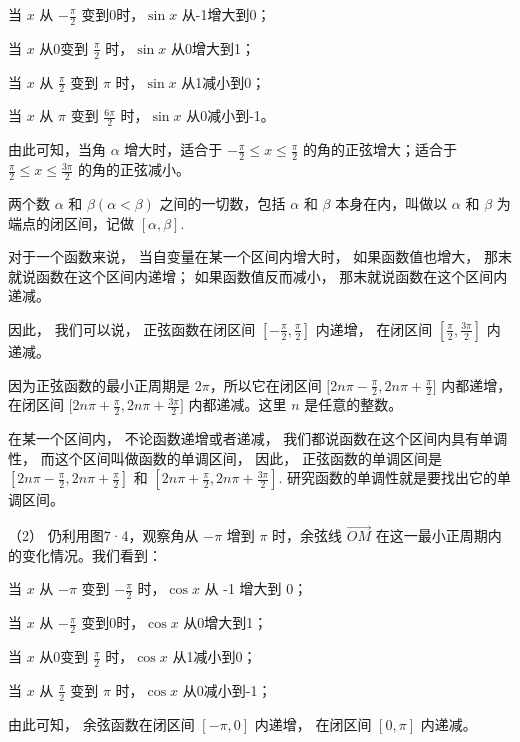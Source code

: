 当 \(x\) 从 \(-\frac{\pi}{2}\) 变到0时，\(\sin x\) 从-1增大到0；

当 \(x\) 从0变到 \(\frac{\pi}{2}\) 时，\(\sin x\) 从0增大到1；

当 \(x\) 从 \(\frac{\pi}{2}\) 变到 \(\pi\) 时，\(\sin x\) 从1减小到0；

当 \(x\) 从 \(\pi\) 变到 \(\frac{6\pi}{2}\) 时，\(\sin x\) 从0减小到-1。

由此可知，当角 \(\alpha\) 增大时，适合于
\(-\frac{\pi}{2} \leqslant x \leqslant \frac{\pi}{2}\)
的角的正弦增大；适合于
\(\frac{\pi}{2} \leqslant x \leqslant \frac{3\pi}{2}\) 的角的正弦减小。

两个数 \(\alpha\) 和 \(\beta (\alpha < \beta)\) 之间的一切数，包括
\(\alpha\) 和 \(\beta\) 本身在内，叫做以 \(\alpha\) 和 \(\beta\)
为端点的闭区间，记做 \([\alpha, \beta]\).

对于一个函数来说， 当自变量在某一个区间内增大时， 如果函数值也增大，
那末就说函数在这个区间内递增； 如果函数值反而减小，
那末就说函数在这个区间内递减。

因此， 我们可以说， 正弦函数在闭区间
\(\left[-\frac{\pi}{2}, \frac{\pi}{2}\right]\) 内递增， 在闭区间
\(\left[\frac{\pi}{2}, \frac{3\pi}{2}\right]\) 内递减。

因为正弦函数的最小正周期是 \(2\pi\)，所以它在闭区间
\(\bigl[2n\pi - \frac{\pi}{2}, 2n\pi + \frac{\pi}{2}\bigr]\)
内都递增，在闭区间
\(\bigl[2n\pi + \frac{\pi}{2}, 2n\pi + \frac{3\pi}{2}\bigr]\)
内都递减。这里 \(n\) 是任意的整数。

在某一个区间内， 不论函数递增或者递减，
我们都说函数在这个区间内具有单调性， 而这个区间叫做函数的单调区间，
因此， 正弦函数的单调区间是
\(\left[2n\pi - \frac{\pi}{2}, 2n\pi + \frac{\pi}{2}\right]\) 和
\(\left[2n\pi +\frac{\pi}{2},2n\pi +\frac{3\pi}{2}\right].\)
研究函数的单调性就是要找出它的单调区间。

（2） 仍利用图7·4，观察角从 \(-\pi\) 增到 \(\pi\) 时，余弦线
\(\overrightarrow{OM}\) 在这一最小正周期内的变化情况。我们看到：

当 \(x\) 从 \(-\pi\) 变到 \(-\frac{\pi}{2}\) 时，\(\cos x\) 从 -1 增大到
0；

当 \(x\) 从 \(-\frac{\pi}{2}\) 变到0时，\(\cos x\) 从0增大到1；

当 \(x\) 从0变到 \(\frac{\pi}{2}\) 时，\(\cos x\) 从1减小到0；

当 \(x\) 从 \(\frac{\pi}{2}\) 变到 \(\pi\) 时，\(\cos x\) 从0减小到-1；

由此可知， 余弦函数在闭区间 \([- \pi, 0]\) 内递增， 在闭区间
\([0, \pi]\) 内递减。

